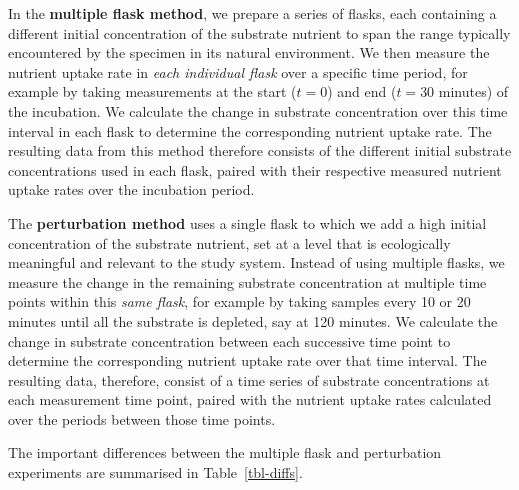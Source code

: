 \documentclass[
  letterpaper,
]{book}
\begin{document}
In the \textbf{multiple flask method}, we prepare a series of flasks,
each containing a different initial concentration of the substrate
nutrient to span the range typically encountered by the specimen in its
natural environment. We then measure the nutrient uptake rate in
\emph{each individual flask} over a specific time period, for example by
taking measurements at the start (\(t=0\)) and end (\(t=30\) minutes) of
the incubation. We calculate the change in substrate concentration over
this time interval in each flask to determine the corresponding nutrient
uptake rate. The resulting data from this method therefore consists of
the different initial substrate concentrations used in each flask,
paired with their respective measured nutrient uptake rates over the
incubation period.

The \textbf{perturbation method} uses a single flask to which we add a
high initial concentration of the substrate nutrient, set at a level
that is ecologically meaningful and relevant to the study system.
Instead of using multiple flasks, we measure the change in the remaining
substrate concentration at multiple time points within this \emph{same
flask}, for example by taking samples every 10 or 20 minutes until all
the substrate is depleted, say at 120 minutes. We calculate the change
in substrate concentration between each successive time point to
determine the corresponding nutrient uptake rate over that time
interval. The resulting data, therefore, consist of a time series of
substrate concentrations at each measurement time point, paired with the
nutrient uptake rates calculated over the periods between those time
points.

The important differences between the multiple flask and perturbation
experiments are summarised in Table~\ref{tbl-diffs}.
\end{document}
